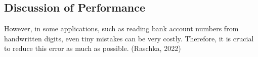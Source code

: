 
\subsection{Discussion of Performance}
However, in some applications, such
as reading bank account numbers from handwritten digits, even tiny mistakes can be very costly.
Therefore, it is crucial to reduce this error as much as possible. (Raschka, 2022)
